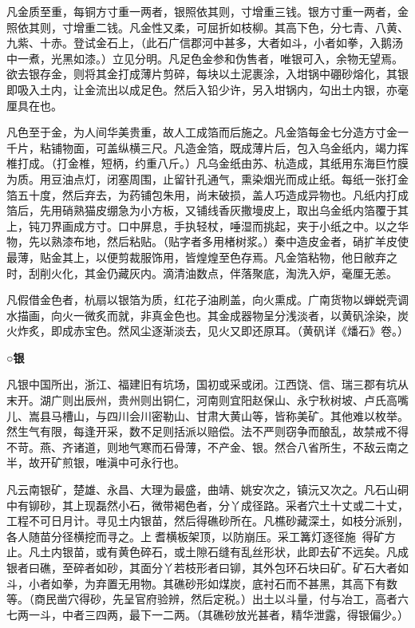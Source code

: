 \documentclass[]{article}
\begin{document}
凡金质至重，每铜方寸重一两者，银照依其则，寸增重三钱。银方寸重一两者，金照依其则，寸增重二钱。凡金性又柔，可屈折如枝柳。其高下色，分七青、八黄、九紫、十赤。登试金石上，（此石广信郡河中甚多，大者如斗，小者如拳，入鹅汤中一煮，光黑如漆。）立见分明。凡足色金参和伪售者，唯银可入，余物无望焉。欲去银存金，则将其金打成薄片剪碎，每块以土泥裹涂，入坩锅中硼砂熔化，其银即吸入土内，让金流出以成足色。然后入铅少许，另入坩锅内，勾出土内银，亦毫厘具在也。

凡色至于金，为人间华美贵重，故人工成箔而后施之。凡金箔每金七分造方寸金一千片，粘铺物面，可盖纵横三尺。凡造金箔，既成薄片后，包入乌金纸内，竭力挥椎打成。（打金椎，短柄，约重八斤。）凡乌金纸由苏、杭造成，其纸用东海巨竹膜为质。用豆油点灯，闭塞周围，止留针孔通气，熏染烟光而成止纸。每纸一张打金箔五十度，然后弃去，为药铺包朱用，尚末破损，盖人巧造成异物也。凡纸内打成箔后，先用硝熟猫皮绷急为小方板，又铺线香灰撒墁皮上，取出乌金纸内箔覆于其上，钝刀界画成方寸。口中屏息，手执轻杖，唾湿而挑起，夹于小纸之中。以之华物，先以熟漆布地，然后粘贴。（贴字者多用楮树浆。）秦中造皮金者，硝扩羊皮使最薄，贴金其上，以便剪裁服饰用，皆煌煌至色存焉。凡金箔粘物，他日敝弃之时，刮削火化，其金仍藏灰内。滴清油数点，伴落聚底，淘洗入炉，毫厘无恙。

凡假借金色者，杭扇以银箔为质，红花子油刷盖，向火熏成。广南货物以蝉蜕壳调水描画，向火一微炙而就，非真金色也。其金成器物呈分浅淡者，以黄矾涂染，炭火炸炙，即成赤宝色。然风尘逐渐淡去，见火又即还原耳。（黄矾详《燔石》卷。）

\textbf{○银}

凡银中国所出，浙江、福建旧有坑场，国初或采或闭。江西饶、信、瑞三郡有坑从末开。湖广则出辰州，贵州则出铜仁，河南则宜阳赵保山、永宁秋树坡、卢氏高嘴儿、嵩县马槽山，与四川会川密勒山、甘肃大黄山等，皆称美矿。其他难以枚举。然生气有限，每逢开采，数不足则括派以赔偿。法不严则窃争而酿乱，故禁戒不得不苛。燕、齐诸道，则地气寒而石骨薄，不产金、银。然合八省所生，不敌云南之半，故开矿煎银，唯滇中可永行也。

凡云南银矿，楚雄、永昌、大理为最盛，曲靖、姚安次之，镇沅又次之。凡石山硐中有铆砂，其上现磊然小石，微带褐色者，分丫成径路。采者穴土十丈或二十丈，工程不可日月计。寻见土内银苗，然后得礁砂所在。凡樵砂藏深土，如枝分派别，各人随苗分径横挖而寻之。上耆横板架顶，以防崩压。采工篝灯逐径施，得矿方止。凡土内银苗，或有黄色碎石，或土隙石缝有乱丝形状，此即去矿不远矣。凡成银者曰礁，至碎者如砂，其面分丫若枝形者曰铆，其外包环石块曰矿。矿石大者如斗，小者如拳，为弃置无用物。其礁砂形如煤炭，底衬石而不甚黑，其高下有数等。（商民凿穴得砂，先呈官府验辨，然后定税。）出土以斗量，付与冶工，高者六七两一斗，中者三四两，最下一二两。（其礁砂放光甚者，精华泄露，得银偏少。）
\end{document}
